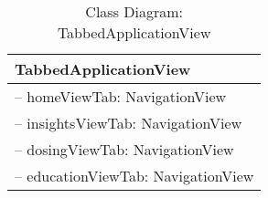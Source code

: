 \begin{table}[H]
\centering
\caption{Class Diagram: TabbedApplicationView}

\hspace{1em}
\renewcommand{\arraystretch}{1.7}

\begin{tabular}{|l|}
\hline
\textbf{TabbedApplicationView} \\
\hline
– homeViewTab: NavigationView \\
– insightsViewTab: NavigationView \\
– dosingViewTab: NavigationView \\
– educationViewTab: NavigationView \\
\hline
\end{tabular}
\end{table}
